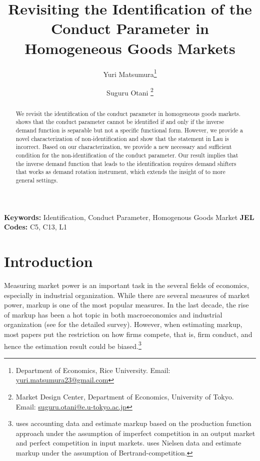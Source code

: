 \documentclass[11pt, a4paper]{article}
\title{Revisiting the Identification of the Conduct Parameter in Homogeneous Goods Markets}
\author{Yuri Matsumura\thanks{Department of Economics, Rice University. Email: \href{mailto:yuri.matsumura23@gmail.com}{yuri.matsumura23@gmail.com}} \and Suguru Otani \thanks{Market Design Center, Department of Economics, University of Tokyo. Email: \href{mailto:suguru.otani@e.u-tokyo.ac.jp}{suguru.otani@e.u-tokyo.ac.jp}
}}
\theoremstyle{remark}
\begin{document}
\maketitle
\begin{abstract}
    We revisit the identification of the conduct parameter in homogeneous goods markets.
    \citet{lauIdentifying1982} shows that the conduct parameter cannot be identified if and only if the inverse demand function is separable but not a specific functional form.
    However, we provide a novel characterization of non-identification and show that the statement in Lau is incorrect.
    Based on our characterization, we provide a new necessary and sufficient condition for the non-identification of the conduct parameter.
    Our result implies that the inverse demand function that leads to the identification requires demand shifters that works as demand rotation instrument, which extends the insight of \citet{bresnahanOligopoly1982} to more general settings.
\end{abstract}

\noindent\textbf{Keywords:} Identification, Conduct Parameter, Homogenous Goods Market
\vspace{0in}
\newline
\noindent\textbf{JEL Codes:} C5, C13, L1

\bigskip


\newpage
\section{Introduction}
Measuring market power is an important task in the several fields of economics, especially in industrial organization.
While there are several measures of market power, markup is one of the most popular measures.
In the last decade, the rise of markup has been a hot topic in both macroeconomics and industrial organization (see \citet{millerIndustrial2025} for the detailed survey).
However, when estimating markup, most papers put the restriction on how firms compete, that is, firm conduct, and hence the estimation result could be biased.\footnote{
\citet{deloeckerRise2020} uses accounting data and estimate markup based on the production function approach under the assumption of imperfect competition in an output market and perfect competition in input markets.
\citet{dopperRising2021} uses Nielsen data and estimate markup under the assumption of Bertrand-competition.}
\end{document}
